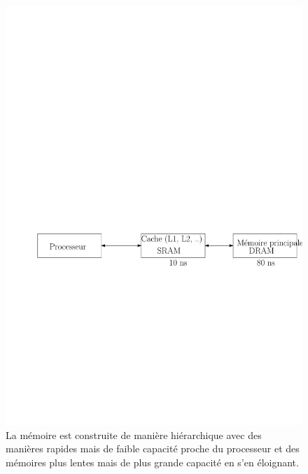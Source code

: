 \begin{figure}[htbp]
\includegraphics[width=\linewidth]{Figs/cache_mem}
\caption{\label{fig:cache_mem} La mémoire est construite de manière hiérarchique avec des manières rapides mais de faible capacité proche du processeur et des mémoires plus lentes mais de plus grande capacité en s'en éloignant.}
\end{figure}

